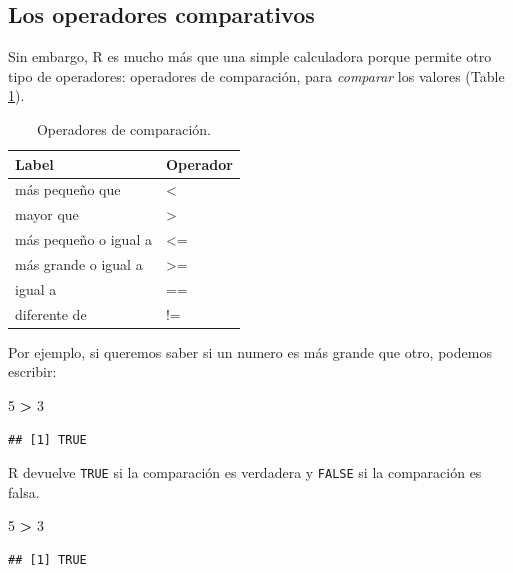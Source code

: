 \documentclass[]{book}
\newenvironment{Shaded}{\begin{snugshade}}{\end{snugshade}}
\newcommand{\DecValTok}[1]{\textcolor[rgb]{0.00,0.00,0.81}{#1}}
\newcommand{\StringTok}[1]{\textcolor[rgb]{0.31,0.60,0.02}{#1}}
\newcommand{\OperatorTok}[1]{\textcolor[rgb]{0.81,0.36,0.00}{\textbf{#1}}}
\begin{document}
\subsection{Los operadores
comparativos}\label{los-operadores-comparativos}

Sin embargo, R es mucho más que una simple calculadora porque permite
otro tipo de operadores: operadores de comparación, para \emph{comparar}
los valores (Table \ref{tab:tabOpCom}).

\begin{table}

\caption{\label{tab:tabOpCom}Operadores de comparación.\label{tab:tabOpCom}}
\centering
\begin{tabular}[t]{l|l}
\hline
Label & Operador\\
\hline
más pequeño que & <\\
\hline
mayor que & >\\
\hline
más pequeño o igual a & <=\\
\hline
más grande o igual a & >=\\
\hline
igual a & ==\\
\hline
diferente de & !=\\
\hline
\end{tabular}
\end{table}

Por ejemplo, si queremos saber si un numero es más grande que otro,
podemos escribir:

\begin{Shaded}
\begin{Highlighting}[]
\DecValTok{5} \OperatorTok{>}\StringTok{ }\DecValTok{3} 
\end{Highlighting}
\end{Shaded}

\begin{verbatim}
## [1] TRUE
\end{verbatim}

R devuelve \texttt{TRUE} si la comparación es verdadera y \texttt{FALSE}
si la comparación es falsa.

\begin{Shaded}
\begin{Highlighting}[]
\DecValTok{5} \OperatorTok{>}\StringTok{ }\DecValTok{3}
\end{Highlighting}
\end{Shaded}

\begin{verbatim}
## [1] TRUE
\end{verbatim}
\end{document}
